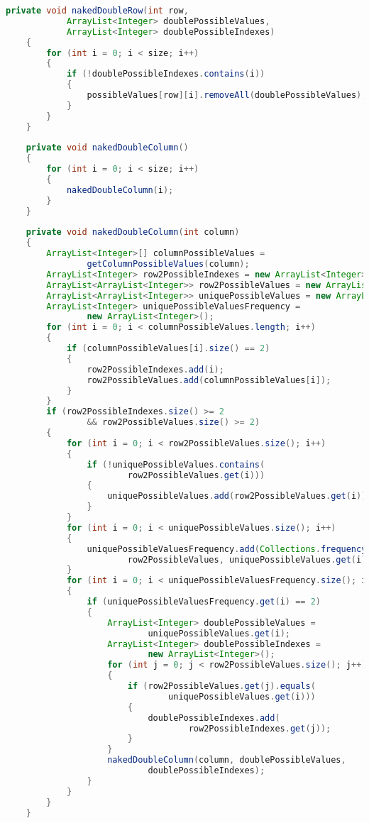 \begin{lstlisting}[language=Java,basicstyle=\tiny,caption=SolverRuleBased.java]
    private void nakedDoubleRow(int row, 
            ArrayList<Integer> doublePossibleValues, 
            ArrayList<Integer> doublePossibleIndexes)
    {
        for (int i = 0; i < size; i++)
        {
            if (!doublePossibleIndexes.contains(i))
            {
                possibleValues[row][i].removeAll(doublePossibleValues);
            }
        }
    }
    
    private void nakedDoubleColumn()
    {
        for (int i = 0; i < size; i++)
        {
            nakedDoubleColumn(i);
        }
    }
    
    private void nakedDoubleColumn(int column)
    {
        ArrayList<Integer>[] columnPossibleValues = 
                getColumnPossibleValues(column);
        ArrayList<Integer> row2PossibleIndexes = new ArrayList<Integer>();
        ArrayList<ArrayList<Integer>> row2PossibleValues = new ArrayList<>();
        ArrayList<ArrayList<Integer>> uniquePossibleValues = new ArrayList<>();
        ArrayList<Integer> uniquePossibleValuesFrequency = 
                new ArrayList<Integer>();
        for (int i = 0; i < columnPossibleValues.length; i++)
        {
            if (columnPossibleValues[i].size() == 2)
            {
                row2PossibleIndexes.add(i);
                row2PossibleValues.add(columnPossibleValues[i]);
            }
        }
        if (row2PossibleIndexes.size() >= 2 
                && row2PossibleValues.size() >= 2)
        {
            for (int i = 0; i < row2PossibleValues.size(); i++)
            {
                if (!uniquePossibleValues.contains(
                        row2PossibleValues.get(i)))
                {
                    uniquePossibleValues.add(row2PossibleValues.get(i));
                }
            }
            for (int i = 0; i < uniquePossibleValues.size(); i++)
            {
                uniquePossibleValuesFrequency.add(Collections.frequency(
                        row2PossibleValues, uniquePossibleValues.get(i)));
            }
            for (int i = 0; i < uniquePossibleValuesFrequency.size(); i++)
            {
                if (uniquePossibleValuesFrequency.get(i) == 2)
                {
                    ArrayList<Integer> doublePossibleValues = 
                            uniquePossibleValues.get(i);
                    ArrayList<Integer> doublePossibleIndexes = 
                            new ArrayList<Integer>();
                    for (int j = 0; j < row2PossibleValues.size(); j++)
                    {
                        if (row2PossibleValues.get(j).equals(
                                uniquePossibleValues.get(i)))
                        {
                            doublePossibleIndexes.add(
                                    row2PossibleIndexes.get(j));
                        }
                    }
                    nakedDoubleColumn(column, doublePossibleValues,
                            doublePossibleIndexes);
                }
            }
        }
    }
    

\end{lstlisting}
